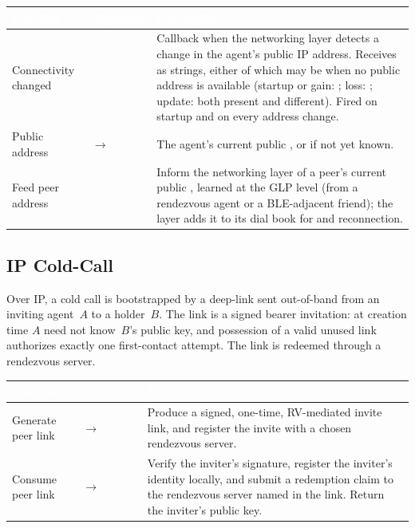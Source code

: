 \begin{longtable}{L{4cm} L{5cm} L{5cm}}
\toprule
{}
\textcolor{white}{\textbf{Function}} &
\textcolor{white}{\textbf{Signature}} &
\textcolor{white}{\textbf{Description}} \\
\midrule
\endhead
Connectivity changed &  & Callback when the networking layer detects a change in the agent's public IP address.  Receives  as  strings, either of which may be  when no public address is available (startup or gain: ; loss: ; update: both present and different).  Fired on startup and on every address change. \\
Public address &  $\to$  & The agent's current public , or  if not yet known. \\
Feed peer address &  & Inform the networking layer of a peer's current public , learned at the GLP level (from a rendezvous agent or a BLE-adjacent friend); the layer adds it to its dial book for  and reconnection. \\
\bottomrule
\end{longtable}

\subsection{IP Cold-Call}
\label{sec:ip-cold-call}
Over IP, a cold call is bootstrapped by a deep-link sent out-of-band from an inviting agent~$A$ to a holder~$B$.  The link is a signed bearer invitation: at creation time $A$ need not know~$B$'s public key, and possession of a valid unused link authorizes exactly one first-contact attempt.  The link is redeemed through a rendezvous server.
\begin{longtable}{L{4cm} L{5cm} L{5cm}}
\toprule
{}
\textcolor{white}{\textbf{Function}} &
\textcolor{white}{\textbf{Signature}} &
\textcolor{white}{\textbf{Description}} \\
\midrule
\endhead
Generate peer link &  $\to$  & Produce a signed, one-time, RV-mediated invite link, and register the invite with a chosen rendezvous server. \\
Consume peer link &  $\to$  & Verify the inviter's signature, register the inviter's identity locally, and submit a redemption claim to the rendezvous server named in the link.  Return the inviter's public key. \\
\bottomrule
\end{longtable}

